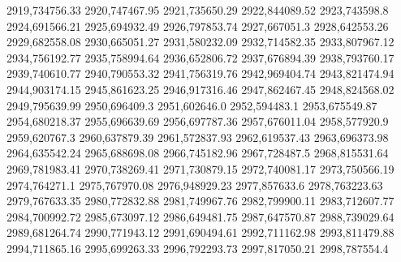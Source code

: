 2919,734756.33
2920,747467.95
2921,735650.29
2922,844089.52
2923,743598.8
2924,691566.21
2925,694932.49
2926,797853.74
2927,667051.3
2928,642553.26
2929,682558.08
2930,665051.27
2931,580232.09
2932,714582.35
2933,807967.12
2934,756192.77
2935,758994.64
2936,652806.72
2937,676894.39
2938,793760.17
2939,740610.77
2940,790553.32
2941,756319.76
2942,969404.74
2943,821474.94
2944,903174.15
2945,861623.25
2946,917316.46
2947,862467.45
2948,824568.02
2949,795639.99
2950,696409.3
2951,602646.0
2952,594483.1
2953,675549.87
2954,680218.37
2955,696639.69
2956,697787.36
2957,676011.04
2958,577920.9
2959,620767.3
2960,637879.39
2961,572837.93
2962,619537.43
2963,696373.98
2964,635542.24
2965,688698.08
2966,745182.96
2967,728487.5
2968,815531.64
2969,781983.41
2970,738269.41
2971,730879.15
2972,740081.17
2973,750566.19
2974,764271.1
2975,767970.08
2976,948929.23
2977,857633.6
2978,763223.63
2979,767633.35
2980,772832.88
2981,749967.76
2982,799900.11
2983,712607.77
2984,700992.72
2985,673097.12
2986,649481.75
2987,647570.87
2988,739029.64
2989,681264.74
2990,771943.12
2991,690494.61
2992,711162.98
2993,811479.88
2994,711865.16
2995,699263.33
2996,792293.73
2997,817050.21
2998,787554.4
